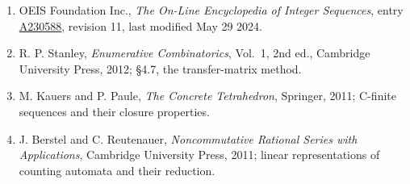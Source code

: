 \documentclass[11pt]{article}
\theoremstyle{definition}
\begin{document}
\begin{enumerate}

\item OEIS Foundation Inc., \emph{The On-Line Encyclopedia of Integer Sequences}, entry \href{https://oeis.org/A230588}{A230588}, revision 11, last modified May 29 2024.

\item R. P. Stanley, \emph{Enumerative Combinatorics}, Vol.~1, 2nd ed., Cambridge University Press, 2012; \S4.7, the transfer-matrix method.

\item M. Kauers and P. Paule, \emph{The Concrete Tetrahedron}, Springer, 2011; C-finite sequences and their closure properties.

\item J. Berstel and C. Reutenauer, \emph{Noncommutative Rational Series with Applications}, Cambridge University Press, 2011; linear representations of counting automata and their reduction.

\end{enumerate}
\end{document}
